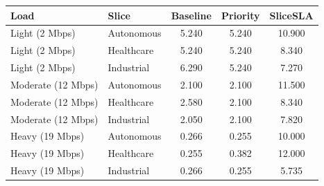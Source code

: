 \begin{tabular}{llccc}
\toprule
Load & Slice & Baseline & Priority & SliceSLA \\
\midrule
Light (2 Mbps) & Autonomous & 5.240 & 5.240 & 10.900 \\
Light (2 Mbps) & Healthcare & 5.240 & 5.240 & 8.340 \\
Light (2 Mbps) & Industrial & 6.290 & 5.240 & 7.270 \\
Moderate (12 Mbps) & Autonomous & 2.100 & 2.100 & 11.500 \\
Moderate (12 Mbps) & Healthcare & 2.580 & 2.100 & 8.340 \\
Moderate (12 Mbps) & Industrial & 2.050 & 2.100 & 7.820 \\
Heavy (19 Mbps) & Autonomous & 0.266 & 0.255 & 10.000 \\
Heavy (19 Mbps) & Healthcare & 0.255 & 0.382 & 12.000 \\
Heavy (19 Mbps) & Industrial & 0.266 & 0.255 & 5.735 \\
\bottomrule
\end{tabular}
